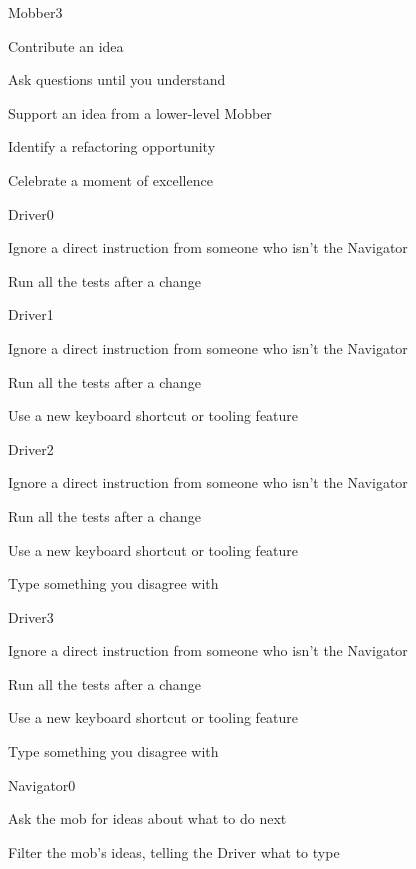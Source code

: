 \documentclass[letterpaper,20pt]{extarticle}
\begin{document}
\begin{role}{Mobber}{3}
  \item Contribute an idea
  \item Ask questions until you understand
  \item Support an idea from a lower-level Mobber
  \item Identify a refactoring opportunity
  \item Celebrate a moment of excellence
\end{role}



\begin{role}{Driver}{0}
  \item Ignore a direct instruction from someone who isn't the Navigator
  \item Run all the tests after a change
\end{role}

\begin{role}{Driver}{1}
  \item Ignore a direct instruction from someone who isn't the Navigator
  \item Run all the tests after a change
  \item Use a new keyboard shortcut or tooling feature
\end{role}

\begin{role}{Driver}{2}
  \item Ignore a direct instruction from someone who isn't the Navigator
  \item Run all the tests after a change
  \item Use a new keyboard shortcut or tooling feature
  \item Type something you disagree with
\end{role}

\begin{role}{Driver}{3}
  \item Ignore a direct instruction from someone who isn't the Navigator
  \item Run all the tests after a change
  \item Use a new keyboard shortcut or tooling feature
  \item Type something you disagree with
\end{role}


\begin{role}{Navigator}{0}
  \item Ask the mob for ideas about what to do next
  \item Filter the mob's ideas, telling the Driver what to type
\end{role}
\end{document}
